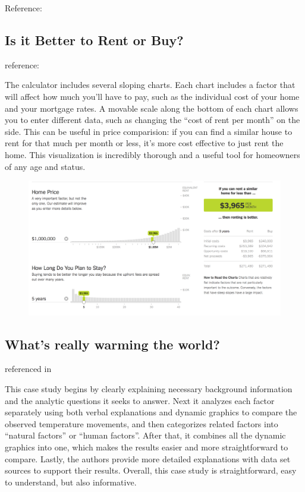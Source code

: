 \documentclass[]{book}
\theoremstyle{definition}
\theoremstyle{definition}
\theoremstyle{definition}
\theoremstyle{remark}
\begin{document}
Reference: \citep{lingui_data}

\subsection{Is it Better to Rent or
Buy?}\label{is-it-better-to-rent-or-buy}

reference: \citep{rent_or_buy}

The calculator includes several sloping charts. Each chart includes a
factor that will affect how much you'll have to pay, such as the
individual cost of your home and your mortgage rates. A movable scale
along the bottom of each chart allows you to enter different data, such
as changing the ``cost of rent per month'' on the side. This can be
useful in price comparision: if you can find a similar house to rent for
that much per month or less, it's more cost effective to just rent the
home. This visualization is incredibly thorough and a useful tool for
homeowners of any age and status.

\begin{figure}
\centering
\includegraphics{images/rentcalc.png}
\caption{}
\end{figure}

\subsection{What's really warming the
world?}\label{whats-really-warming-the-world}

\citep{world_warming} referenced in \citep{int_viz_1}

This case study begins by clearly explaining necessary background
information and the analytic questions it seeks to answer. Next it
analyzes each factor separately using both verbal explanations and
dynamic graphics to compare the observed temperature movements, and then
categorizes related factors into ``natural factors'' or ``human
factors''. After that, it combines all the dynamic graphics into one,
which makes the results easier and more straightforward to compare.
Lastly, the authors provide more detailed explanations with data set
sources to support their results. Overall, this case study is
straightforward, easy to understand, but also informative.
\end{document}
